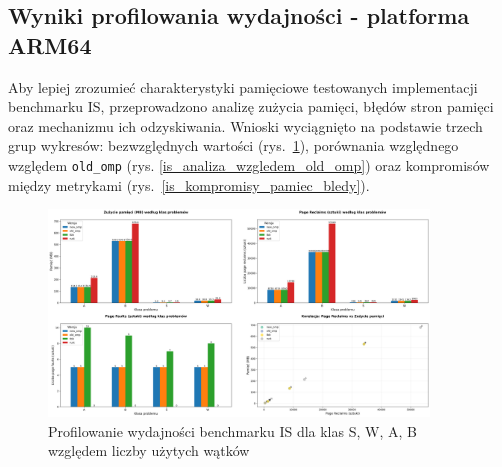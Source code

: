 \subsection{Wyniki profilowania wydajności - platforma ARM64}
Aby lepiej zrozumieć charakterystyki pamięciowe testowanych implementacji benchmarku IS, przeprowadzono analizę zużycia pamięci, błędów stron pamięci oraz mechanizmu ich odzyskiwania. Wnioski wyciągnięto na podstawie trzech grup wykresów: bezwzględnych wartości \mbox{(rys. \ref{is_porownanie_zuzycia_pamieci})}, porównania względnego względem \texttt{old\_omp} (rys. \ref{is_analiza_wzgledem_old_omp}) oraz kompromisów między metrykami \mbox{(rys. \ref{is_kompromisy_pamiec_bledy})}.
\begin{figure}[H]
    \centering
    \includegraphics[width=0.9\textwidth]{analiza/images/parallel/is/arm/chart_01_memory_comparison.png}
    \caption{Profilowanie wydajności benchmarku IS dla klas S, W, A, B względem liczby użytych wątków}
    \label{is_porownanie_zuzycia_pamieci}
\end{figure}
